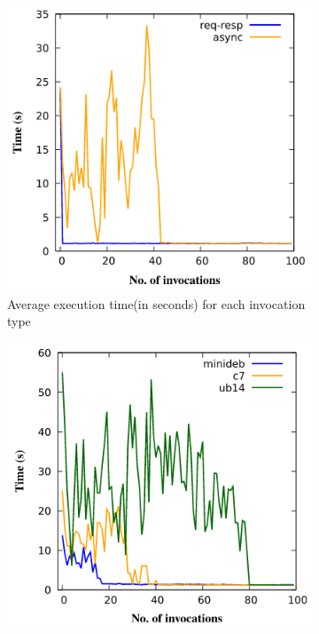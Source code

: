 \begin{figure}[!b]
\centering %
\begin{subfigure}{0.32\textwidth}
  \includegraphics[width=\linewidth]{images/scar-1.png}
  \caption{Average execution time(in seconds) for each invocation type \cite{PEREZ201850}}
  \label{fig:scar1}
\end{subfigure} \hfil%
\begin{subfigure}{0.33\textwidth}
  \includegraphics[width=\linewidth]{images/scar-3.png}

\end{subfigure}
\end{figure}
